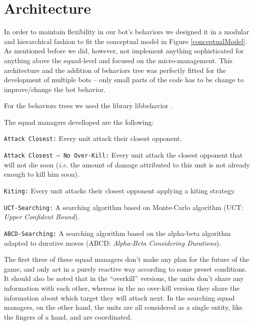 \section{Architecture}
In order to maintain flexibility in our bot's behaviors we designed it in a modular and hierarchical fashion to fit the conceptual model in Figure \ref{conceptualModel}. As mentioned before we did, however, not implement anything sophisticated for anything above the squad-level and focused on the micro-management.
This architecture and the addition of behaviors tree was perfectly fitted for the development of multiple bots -- only small parts of the code has to be change to improve/change the bot behavior.

For the behaviors trees we used the library libbehavior \cite{libbehavior}.

The squad managers develloped are the following:
\begin{shortitem}
\item \texttt{Attack Closest:} Every unit attack their closest opponent.
\item \texttt{Attack Closest -- No Over-Kill:} Every unit attack the closest opponent that will not die soon (\emph{i.e.} the amount of damage attributed to this unit is not already enough to kill him soon).
\item \texttt{Kiting:} Every unit attacks their closest opponent applying a kiting strategy.
\item \texttt{UCT-Searching:} A searching algorithm based on Monte-Carlo algorithm (UCT: \emph{Upper Confident Bound}).
\item \texttt{ABCD-Searching:} A searching algorithm based on the alpha-beta algorithm adapted to durative moves (ABCD: \emph{Alpha-Beta Considering Durations}).
\end{shortitem}

The first three of these squad managers don't make any plan for the future of the game, and only act in a purely reactive way according to some preset conditions. 
It should also be noted that in the ``overkill'' versions, the units don't share any information with each other, whereas in the no over-kill version they share the information about which target they will attack next. 
In the searching squad managers, on the other hand, the units are all considered as a single entity, like the fingers of a hand, and are coordinated.
